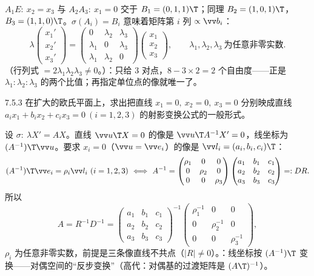 \jie $A_1E:\ x_2=x_3$ 与 $A_2A_3:\ x_1=0$ 交于 $B_1=(0,1,1)\T$；同理 $B_2=(1,0,1)\T$，$B_3=(1,1,0)\T$。$\sigma(A_i)=B_i$ 意味着矩阵第 $i$ 列 $\propto\vv b_i$：
\[
\lambda\begin{pmatrix}x_1'\\x_2'\\x_3'\end{pmatrix}=\begin{pmatrix}0&\lambda_2&\lambda_3\\\lambda_1&0&\lambda_3\\\lambda_1&\lambda_2&0\end{pmatrix}\begin{pmatrix}x_1\\x_2\\x_3\end{pmatrix},\qquad \lambda_1,\lambda_2,\lambda_3\ \text{为任意非零实数}.
\]
（行列式 $=2\lambda_1\lambda_2\lambda_3\neq0$。）：只给 3 对点，$8-3\times2=2$ 个自由度——正是 $\lambda_1:\lambda_2:\lambda_3$ 的两个比值；再指定单位点的像就唯一了。

\begin{ex}{7.5.3}
在扩大的欧氏平面上，求出把直线 $x_1=0,\ x_2=0,\ x_3=0$ 分别映成直线 $a_ix_1+b_ix_2+c_ix_3=0\ (i=1,2,3)$ 的射影变换公式的一般形式。
\end{ex}
\jie 设 $\sigma:\ \lambda X'=AX$。直线 $\vv u\T X=0$ 的像是 $\vv u\T A^{-1}X'=0$，线坐标为 $(A^{-1})\T\vv u$。要求 $x_i=0$（$\vv u=\vv e_i$）的像是 $\vv l_i=(a_i,b_i,c_i)\T$：
\[
(A^{-1})\T\vv e_i=\rho_i\vv l_i\ (i=1,2,3)\ \Longleftrightarrow\ A^{-1}=\begin{pmatrix}\rho_1&0&0\\0&\rho_2&0\\0&0&\rho_3\end{pmatrix}\begin{pmatrix}a_1&b_1&c_1\\a_2&b_2&c_2\\a_3&b_3&c_3\end{pmatrix}=:DR .
\]
所以
\[
A=R^{-1}D^{-1}=\begin{pmatrix}a_1&b_1&c_1\\a_2&b_2&c_2\\a_3&b_3&c_3\end{pmatrix}^{-1}\begin{pmatrix}\rho_1^{-1}&0&0\\0&\rho_2^{-1}&0\\0&0&\rho_3^{-1}\end{pmatrix},
\]
$\rho_i$ 为任意非零实数，前提是三条像直线不共点（$|R|\neq0$）。：线坐标按 $(A^{-1})\T$ 变换——对偶空间的“反步变换”（高代：对偶基的过渡矩阵是 $(A\T)^{-1}$）。

